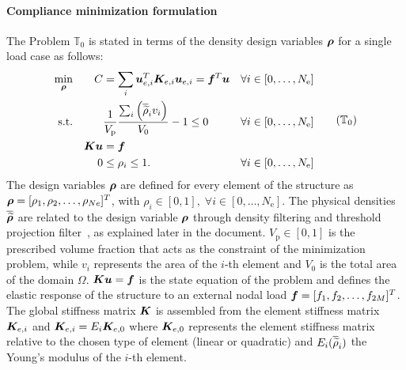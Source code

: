 \paragraph{Compliance minimization formulation} The Problem $\mathbb{T}_0$ is stated in terms of the density design variables $\bm{\rho}$ for a single load case as follows:
\begin{equation}
    \begin{aligned}
    \min_{\vect{\rho}}         && C &= \sum_{i} \vect{u}_{e,i}^T \matr{K}_{e,i} \vect{u}_{e,i}=\vect{f}^T\vect{u}&& \forall i \in [0,\dots,N_\text{e}]                         \\
    \textrm{s.t.}   && & \frac{1}{V_\text{p}}\frac{\sum_{i} \left(\rhophys_i v_i \right)}{V_0} - 1 \leq 0 && \forall i \in [0,\dots,N_\text{e}] \\
    && \matr{K}\vect{u} &= \vect{f} &&\\
    && 0 &\leq \rho_i \leq 1. && \forall i \in [0,\dots,N_\text{e}] \\
    \end{aligned}
    \tag{$\mathbb{T}_0$}
    \label{eq:02_prob-comp}
\end{equation}
The design variables $\bm{\rho}$ are defined for every element of the structure as $\bm{\rho} = [\rho_1, \rho_2, \ldots,\rho_{Ne}]^T$, with $\rho_i \in [0,1], \; \forall i \in [0,\dots,N_\text{e}]$. The physical densities $\bm{\overline{\widetilde{\rho}}}$ are related to the design variable $\bm{\rho}$ through density filtering and threshold projection filter~, as explained later in the document. $V_\text{p}\in [0,1]$ is the prescribed volume fraction that acts as the constraint of the minimization problem, while $v_i$ represents the area of the $i$-th element and $V_0$ is the total area of the domain $\Omega$. $\bm{K}\bm{u} = \bm{f}$ is the state equation of the problem and defines the elastic response of the structure to an external nodal load $\bm{f}=[f_1, f_2, \ldots,f_{2M}]^T$. The global stiffness matrix $\bm{K}$ is assembled from the element stiffness matrix $\bm{K}_{e,i}$ and $\bm{K}_{e,i} = E_i \bm{K}_{e,0}$ where $\bm{K}_{e,0}$ represents the element stiffness matrix relative to the chosen type of element (linear or quadratic) and $E_i(\overline{\widetilde{\rho}}_i)$ the Young's modulus of the $i$-th element. 

